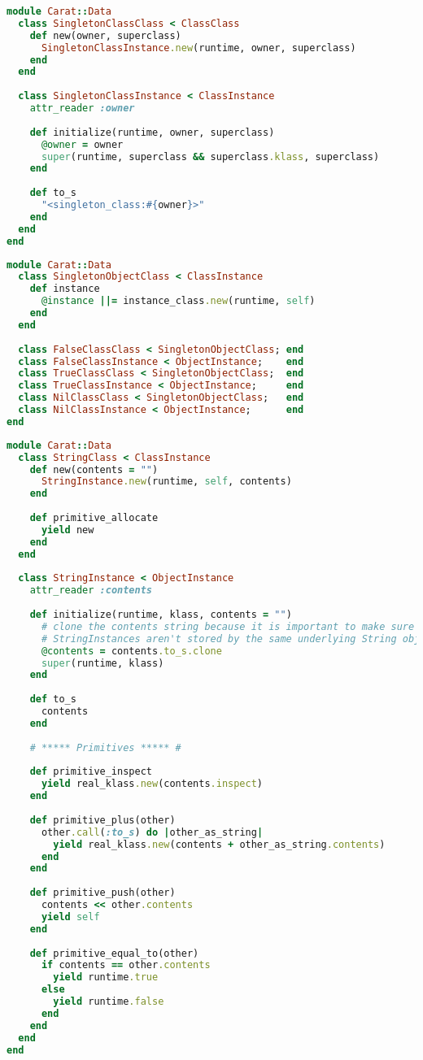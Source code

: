 \begin{lstlisting}[title={\small\Helvetica data/singleton\_class.rb},language=Ruby]
module Carat::Data
  class SingletonClassClass < ClassClass
    def new(owner, superclass)
      SingletonClassInstance.new(runtime, owner, superclass)
    end
  end
  
  class SingletonClassInstance < ClassInstance
    attr_reader :owner
    
    def initialize(runtime, owner, superclass)
      @owner = owner
      super(runtime, superclass && superclass.klass, superclass)
    end
    
    def to_s
      "<singleton_class:#{owner}>"
    end
  end
end

\end{lstlisting}
\begin{lstlisting}[title={\small\Helvetica data/singletons.rb},language=Ruby]
module Carat::Data
  class SingletonObjectClass < ClassInstance
    def instance
      @instance ||= instance_class.new(runtime, self)
    end
  end
  
  class FalseClassClass < SingletonObjectClass; end
  class FalseClassInstance < ObjectInstance;    end
  class TrueClassClass < SingletonObjectClass;  end
  class TrueClassInstance < ObjectInstance;     end
  class NilClassClass < SingletonObjectClass;   end
  class NilClassInstance < ObjectInstance;      end
end

\end{lstlisting}
\begin{lstlisting}[title={\small\Helvetica data/string.rb},language=Ruby]
module Carat::Data
  class StringClass < ClassInstance
    def new(contents = "")
      StringInstance.new(runtime, self, contents)
    end
  
    def primitive_allocate
      yield new
    end
  end
  
  class StringInstance < ObjectInstance
    attr_reader :contents
  
    def initialize(runtime, klass, contents = "")
      # clone the contents string because it is important to make sure that two separate 
      # StringInstances aren't stored by the same underlying String object
      @contents = contents.to_s.clone
      super(runtime, klass)
    end
    
    def to_s
      contents
    end
    
    # ***** Primitives ***** #
    
    def primitive_inspect
      yield real_klass.new(contents.inspect)
    end
    
    def primitive_plus(other)
      other.call(:to_s) do |other_as_string|
        yield real_klass.new(contents + other_as_string.contents)
      end
    end
    
    def primitive_push(other)
      contents << other.contents
      yield self
    end
    
    def primitive_equal_to(other)
      if contents == other.contents
        yield runtime.true
      else
        yield runtime.false
      end
    end
  end
end

\end{lstlisting}
